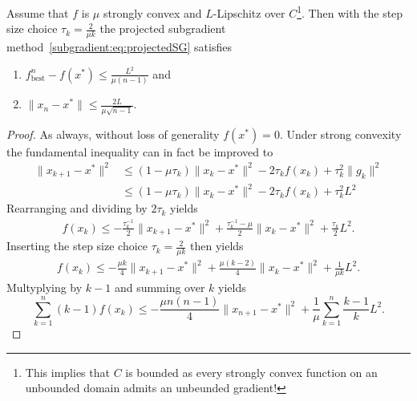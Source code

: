 \begin{theorem}
    Assume that $f$ is $\mu$ strongly convex and $L$-Lipschitz over $C$\footnote{This implies that $C$ is bounded as every strongly convex function on an unbounded domain admits an unbeunded gradient!}. Then with the step size choice $\tau_k = \frac{2}{\mu k}$ the projected subgradient method~\eqref{subgradient:eq:projectedSG} satisfies
    \begin{enumerate}
        \item $f^n_{\mathrm{best}}-f(x^*)\leq \frac{L^2}{\mu (n-1)}$ and
        \item $\|x_n-x^*\|\leq \frac{2L}{\mu \sqrt{n-1}}$.
    \end{enumerate}
\end{theorem}
\begin{proof}
    As always, without loss of generality $f(x^*)=0$. Under strong convexity the fundamental inequality can in fact be improved to 
    \begin{equation}
        \begin{aligned}
            \|x_{k+1}-x^*\|^2 
            &\leq (1-\mu\tau_k)\|x_k- x^*\|^2 - 2\tau_k f(x_k) + \tau_k^2\|g_k\|^2\\
            &\leq (1-\mu\tau_k)\|x_k- x^*\|^2 - 2\tau_k f(x_k) + \tau_k^2L^2
        \end{aligned}
    \end{equation}
    Rearranging and dividing by $2\tau_k$ yields
    \begin{equation}
        \begin{aligned}
            f(x_k)
            \leq -\frac{\tau_k^{-1}}{2}\|x_{k+1}-x^*\|^2 + \frac{\tau_k^{-1}-\mu}{2}\|x_k- x^*\|^2  + \frac{\tau_k}{2}L^2.
        \end{aligned}
    \end{equation}
    Inserting the step size choice $\tau_k = \frac{2}{\mu k}$ then yields
    \begin{equation}
        \begin{aligned}
            f(x_k)
            \leq -\frac{\mu k}{4} \|x_{k+1}-x^*\|^2 + \frac{\mu(k-2)}{4}\|x_k- x^*\|^2  + \frac{1}{\mu k}L^2.
        \end{aligned}
    \end{equation}
    Multyplying by $k-1$ and summing over $k$ yields
    \begin{equation}
        \sum_{k=1}^{n} (k-1)f(x_k) \leq -\frac{\mu n(n-1)}{4} \|x_{n+1}-x^*\|^2 + \frac{1}{\mu}\sum_{k=1}^{n}\frac{k-1}{k}L^2.
    \end{equation}

\end{proof}
